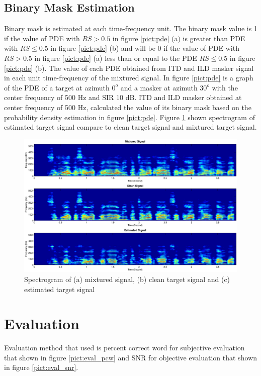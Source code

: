 \documentclass[a4paper]{jpconf}
\begin{document}
\subsection{Binary Mask Estimation}
Binary mask is estimated at each time-frequency unit. The binary mask value is 1 if the value of PDE with $RS > 0.5$ in figure \ref{pict:pde} (a) is greater than PDE with $RS \leq 0.5$ in figure \ref{pict:pde} (b) and will be 0 if the value of PDE with $RS > 0.5$ in figure \ref{pict:pde} (a) less than or equal to the PDE $RS \leq 0.5$ in figure \ref{pict:pde} (b). The value of each PDE obtained from ITD and ILD masker signal in each unit time-frequency of the mixtured signal. In figure \ref{pict:pde} is a graph of the PDE of a target at azimuth $0^o$ and a masker at azimuth $30^o$ with the center frequency of 500 Hz and SIR 10 dB. ITD and ILD masker obtained at center frequency of 500 Hz, calculated the value of its binary mask based on the probability density estimation in figure \ref{pict:pde}. Figure \ref{pict:spect_est_sig} shown spectrogram of estimated target signal compare to clean target signal and mixtured target signal.

\begin{figure}[h]
    \centering
    \includegraphics[width=7in]{pict/spectrogram_results.eps}
    \caption{\label{pict:spect_est_sig}Spectrogram of (a) mixtured signal, (b) clean target signal and (c) estimated target signal}
\end{figure} 

\section{Evaluation}
Evaluation method that used is percent correct word for subjective evaluation that shown in figure \ref{pict:eval_pcw} and SNR for objective evaluation that shown in figure \ref{pict:eval_snr}.
\end{document}
